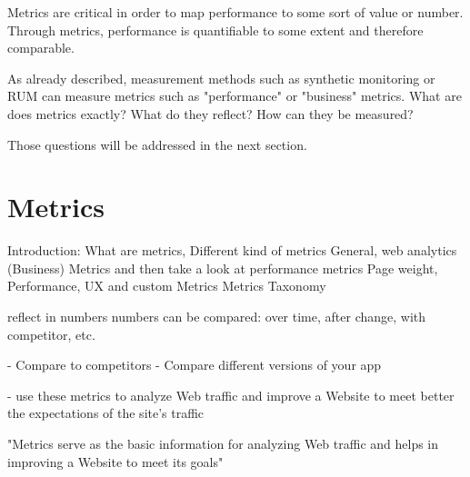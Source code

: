 
Metrics are critical in order to map performance to some sort of value or number.
Through metrics, performance is quantifiable to some extent and therefore comparable.

As already described, measurement methods such as synthetic monitoring or RUM can measure metrics such as "performance" or "business" metrics.
What are does metrics exactly?
What do they reflect?
How can they be measured?

Those questions will be addressed in the next section.









\section{Metrics}






Introduction: What are metrics, Different kind of metrics
General, web analytics (Business) Metrics and then take a look at performance metrics
Page weight, Performance, UX and custom Metrics
Metrics Taxonomy



reflect in numbers
numbers can be compared: over time, after change, with competitor, etc.

- Compare to competitors
- Compare different versions of your app

- use these metrics to analyze Web traffic and improve a Website to meet better the expectations of the site’s traffic

"Metrics serve as the basic information for analyzing Web traffic and helps in improving a Website to meet its goals"



